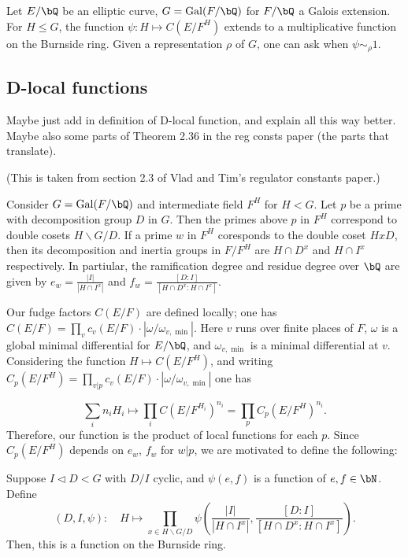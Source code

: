 \begin{example}
Let $E / \bQ$ be an elliptic curve, $G = \Gal(F / \bQ)$ for $F / \bQ$ a Galois extension. For $H \leq G$, the function $\psi \colon H \mapsto C(E / F^H)$ extends to a multiplicative function on the Burnside ring. Given a representation $\rho$ of $G$, one can ask when $\psi \sim_{\rho} 1$.
\end{example}

\subsection{D-local functions}\label{D-loc}

{\color{red} Maybe just add in definition of D-local function, and explain all this way better. Maybe also some parts of Theorem 2.36 in the reg consts paper (the parts that translate).}

(This is taken from section 2.3 of Vlad and Tim's regulator constants paper.)

Consider $G = \Gal(F / \bQ)$ and intermediate field $F^H$ for $H < G$. Let $p$ be a prime with decomposition group $D$ in $G$. 
Then the primes above $p$ in $F^H$ correspond to double cosets $H\backslash G/ D$. If a prime $w$ in $F^H$ coresponds to the double coset $HxD$, then its decomposition and inertia groups in $F / F^H$ are $H \cap D^x$ and $H \cap I^x$ respectively. In partiular, the ramification degree and residue degree over $\bQ$ are given by $e_w = \frac{|I|}{|H \cap I^x|}$ and $f_w = \frac{[D \colon I]}{[H \cap D^x \colon H \cap I^x]}$. 

Our fudge factors $C(E / F)$ are defined locally; one has $C(E / F) = \prod_v c_v(E / F) \cdot |\omega / \omega_{v, \min}|$. Here $v$ runs over finite places of $F$, $\omega$ is a global minimal differential for $E / \bQ$, and $\omega_{v, \min}$ is a minimal differential at $v$.
Considering the function $H \mapsto C(E / F^H)$, and writing $C_p(E / F^H) =\prod_{v | p} c_v(E / F)\cdot |\omega / \omega_{v, \min}|$ one has

\[ \sum_{i} n_i H_i \mapsto \prod_i C(E / F^{H_i})^{n_i} = \prod_{p} C_p(E / F^H)^{n_i}. \]
Therefore, our function is the product of local functions for each $p$. Since $C_p(E / F^H)$ depends on $e_w$, $f_w$ for $w | p$, we are motivated to define the following:

\begin{defn}\label{D-I-fn}
    Suppose $I \triangleleft D < G$ with $D / I$ cyclic, and $\psi(e,f)$ is a function of $e, f \in \bN$. Define
    \[ \left(D, I, \psi\right) \colon \quad H \mapsto \prod_{x \in H\backslash G / D} \psi\left(\frac{|I|}{|H \cap I^x|}, \frac{[D \colon I]}{[H \cap D^x \colon H \cap I^x]}\right). \]
    Then, this is a function on the Burnside ring.
\end{defn}

